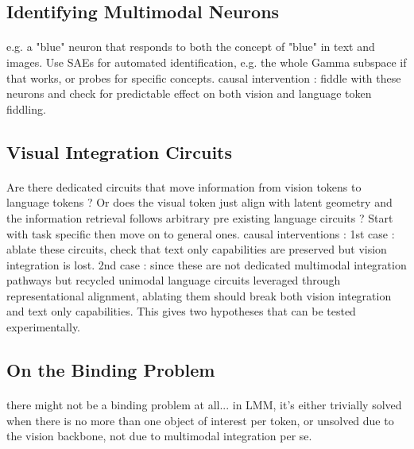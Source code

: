 \documentclass{article}
\begin{document}
\subsection{Identifying Multimodal Neurons}

\paragraph{}e.g. a "blue" neuron that responds to both the concept of "blue" in text and images. Use SAEs for automated identification, e.g. the whole Gamma subspace if that works, or probes for specific concepts. causal intervention : fiddle with these neurons and check for predictable effect on both vision and language token fiddling.

\subsection{Visual Integration Circuits}

\paragraph{}Are there dedicated circuits that move information from vision tokens to language tokens ? Or does the visual token just align with latent geometry and the information retrieval follows arbitrary pre existing language circuits ? Start with task specific then move on to general ones. causal interventions : 1st case : ablate these circuits, check that text only capabilities are preserved but vision integration is lost. 2nd case : since these are not dedicated multimodal integration pathways but recycled unimodal language circuits leveraged through representational alignment, ablating them should break both vision integration and text only capabilities. This gives two hypotheses that can be tested experimentally.

\subsection{On the Binding Problem}

\paragraph{}there might not be a binding problem at all... in LMM, it's either trivially solved when there is no more than one object of interest per token, or unsolved due to the vision backbone, not due to multimodal integration per se.
\end{document}

